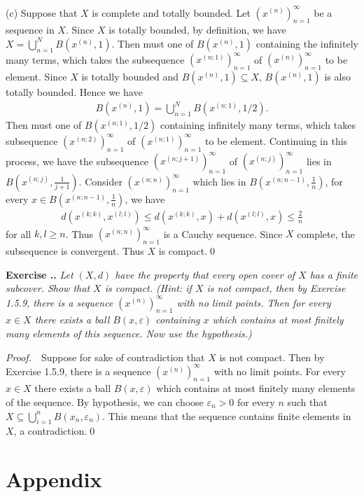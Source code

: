 \documentclass{book}
\newcommand{\pff}{\vspace{.25em}\noindent\emph{Proof.}~~}
\newcounter{Exercise}[section]
\renewcommand{\theExercise}{\thesection.\arabic{Exercise}.}
\newcommand{\new}{\vspace{1.5em}\noindent\textbf{Exercise \stepcounter{Exercise}\textbf{\theExercise}} }
\begin{document}
(c) Suppose that $X$ is complete and totally bounded. Let $(x^{(n)})_{n=1}^{\infty}$ be a sequence in $X$. Since $X$ is totally bounded, by definition, we have $X=\bigcup_{n=1}^{N}B(x^{(n)},1)$. Then must one of $B(x^{(n)},1)$ containing the infinitely many terms, which takes the subsequence $(x^{(n;1)})_{n=1}^{\infty}$ of $(x^{(n)})_{n=1}^{\infty}$ to be element. Since $X$ is totally bounded and $B(x^{(n)},1)\subseteq X$, $B(x^{(n)},1)$ is also totally bounded. Hence we have
    \begin{align*}
        B(x^{(n)},1)=\bigcup_{n=1}^{N}B(x^{(n;1)},1/2).
    \end{align*}
Then must one of $B(x^{(n;1)},1/2)$ containing infinitely many terms, which takes subsequence $(x^{(n;2)})_{n=1}^{\infty}$ of $(x^{(n;1)})_{n=1}^{\infty}$ to be element. Continuing in this process, we have the subsequence $(x^{(n;j+1)})_{n=1}^{\infty}$ of $(x^{(n;j)})_{n=1}^{\infty}$ lies in $B(x^{(n;j)},\frac{1}{j+1})$. Consider $(x^{(n;n)})_{n=1}^{\infty}$ which lies in $B(x^{(n;n-1)},\frac{1}{n})$, for every $x\in B(x^{(n;n-1)},\frac{1}{n})$, we have
    \begin{align*}
        d(x^{(k;k)},x^{(l;l)})\leq d(x^{(k;k)},x)+d(x^{(l;l)},x)\leq\frac{2}{n}
    \end{align*}
for all $k,l\geq n$. Thus $(x^{(n;n)})_{n=1}^{\infty}$ is a Cauchy sequence. Since $X$ complete, the subsequence is convergent. Thus $X$ is compact.\qed

\new\emph{Let $(X,d)$ have the property that every open cover of $X$ has a finite subcover. Show that $X$ is compact. (Hint: if $X$ is not compact, then by Exercise 1.5.9, there is a sequence $(x^{(n)})_{n=1}^{\infty}$ with no limit points. Then for every $x\in X$ there exists a ball $B(x,\varepsilon)$ containing $x$ which contains at most finitely many elements of this sequence. Now use the hypothesis.)}

\pff Suppose for sake of contradiction that $X$ is not compact. Then by Exercise 1.5.9, there is a sequence $(x^{(n)})_{n=1}^{\infty}$ with no limit points. For every $x\in X$ there exists a ball $B(x,\varepsilon)$ which contains at most finitely many elements of the sequence. By hypothesis, we can choose $\varepsilon_n>0$ for every $n$ such that $X\subseteq\bigcup_{i=1}^{n}B(x_n,\varepsilon_n)$. This means that the sequence contains finite elements in $X$, a contradiction.\qed

\newpage
\section{Appendix}
\end{document}

